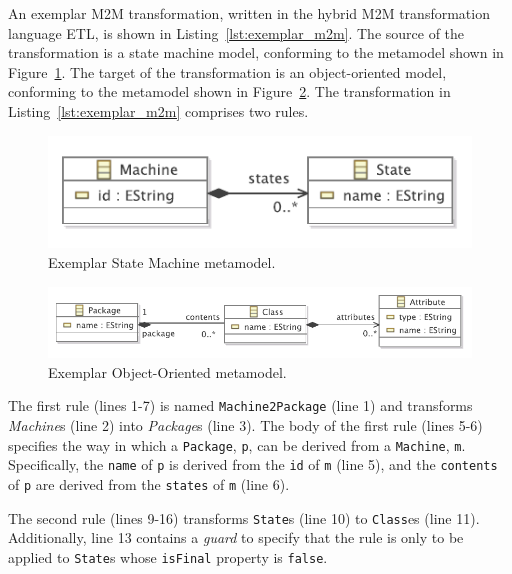An exemplar M2M transformation, written in the hybrid M2M transformation language ETL, is shown in Listing~\ref{lst:exemplar_m2m}. The source of the transformation is a state machine model, conforming to the metamodel shown in Figure~\ref{fig:state_machine_mm}. The target of the transformation is an object-oriented model, conforming to the metamodel shown in Figure~\ref{fig:object_oriented_mm}. The transformation in Listing~\ref{lst:exemplar_m2m} comprises two rules.

\begin{figure}[htbp]
  \begin{center}
    \leavevmode
    \includegraphics[scale=0.9]{2.Background/images/StateMachines.pdf}
  \end{center}
  \caption{Exemplar State Machine metamodel.}
  \label{fig:state_machine_mm}
\end{figure}

\begin{figure}[htbp]
  \begin{center}
    \leavevmode
    \includegraphics[scale=0.9]{2.Background/images/OO.pdf}
  \end{center}
  \caption{Exemplar Object-Oriented metamodel.}
  \label{fig:object_oriented_mm}
\end{figure}

The first rule (lines 1-7) is named \texttt{Machine2Package} (line 1) and transforms \emph{Machine}s (line 2) into \emph{Package}s (line 3). The body of the first rule (lines 5-6) specifies the way in which a \texttt{Package}, \texttt{p}, can be derived from a \texttt{Machine}, \texttt{m}. Specifically, the \texttt{name} of \texttt{p} is derived from the \texttt{id} of \texttt{m} (line 5), and the \texttt{contents} of \texttt{p} are derived from the \texttt{states} of \texttt{m} (line 6). 

The second rule (lines 9-16) transforms \texttt{State}s (line 10) to \texttt{Class}es (line 11). Additionally, line 13 contains a \emph{guard} to specify that the rule is only to be applied to \texttt{State}s whose \texttt{isFinal} property is \texttt{false}.

